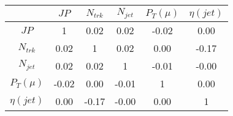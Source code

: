 \begin{tabular}{|c|c|c|c|c|c|} 
\hline
 & $JP$ & $N_{trk}$ & $N_{jet}$ & $P_{T} (\mu)$ & $\eta (jet)$ \\ \hline
$JP$ & 1 & 0.02 & 0.02 & -0.02 & 0.00 \\
$N_{trk}$ & 0.02 & 1 & 0.02 & 0.00 & -0.17 \\
$N_{jet}$ & 0.02 & 0.02 & 1 & -0.01 & -0.00 \\
$P_{T} (\mu)$ & -0.02 & 0.00 & -0.01 & 1 & 0.00 \\
$\eta (jet)$ & 0.00 & -0.17 & -0.00 & 0.00 & 1 \\
\hline 
\end{tabular} 


